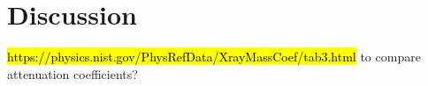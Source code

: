 \section{Discussion}

\hl{https://physics.nist.gov/PhysRefData/XrayMassCoef/tab3.html} to compare attenuation coefficients?
